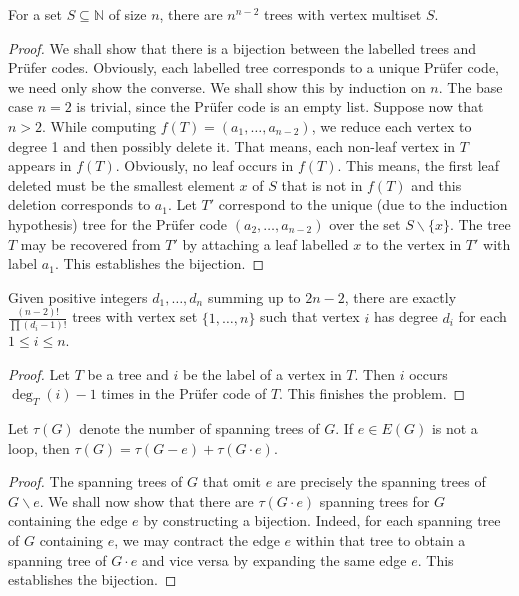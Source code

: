 \begin{theorem}[Cayley, 1889]
    For a set $S\subseteq\mathbb{N}$ of size $n$, there are $n^{n - 2}$ trees with vertex multiset $S$.
\end{theorem}
\begin{proof}
    We shall show that there is a bijection between the labelled trees and Pr\"ufer codes. Obviously, each labelled tree corresponds to a unique Pr\"ufer code, we need only show the converse. We shall show this by induction on $n$. The base case $n = 2$ is trivial, since the Pr\"ufer code is an empty list. Suppose now that $n > 2$. While computing $f(T)=(a_1,\ldots,a_{n-2})$, we reduce each vertex to degree 1 and then possibly delete it. That means, each non-leaf vertex in $T$ appears in $f(T)$. Obviously, no leaf occurs in $f(T)$. This means, the first leaf deleted must be the smallest element $x$ of $S$ that is not in $f(T)$ and this deletion corresponds to $a_1$. Let $T'$ correspond to the unique (due to the induction hypothesis) tree for the Pr\"ufer code $(a_2,\ldots,a_{n-2})$ over the set $S\backslash\{x\}$. The tree $T$ may be recovered from $T'$ by attaching a leaf labelled $x$ to the vertex in $T'$ with label $a_1$. This establishes the bijection.
\end{proof}

\begin{corollary}
    Given positive integers $d_1,\ldots,d_n$ summing up to $2n - 2$, there are exactly $\frac{(n-2)!}{\prod(d_i -1)!}$ trees with vertex set $\{1,\ldots,n\}$ such that vertex $i$ has degree $d_i$ for each $1\le i\le n$.
\end{corollary}
\begin{proof}
    Let $T$ be a tree and $i$ be the label of a vertex in $T$. Then $i$ occurs $\deg_T(i) - 1$ times in the Pr\"ufer code of $T$. This finishes the problem.
\end{proof}

\begin{definition}
\end{definition}

\begin{proposition}
    Let $\tau(G)$ denote the number of spanning trees of $G$. If $e\in E(G)$ is not a loop, then $\tau(G) = \tau(G - e) + \tau(G\cdot e)$.
\end{proposition}
\begin{proof}
    The spanning trees of $G$ that omit $e$ are precisely the spanning trees of $G\backslash e$. We shall now show that there are $\tau(G\cdot e)$ spanning trees for $G$ containing the edge $e$ by constructing a bijection. Indeed, for each spanning tree of $G$ containing $e$, we may contract the edge $e$ within that tree to obtain a spanning tree of $G\cdot e$ and vice versa by expanding the same edge $e$. This establishes the bijection.
\end{proof}

